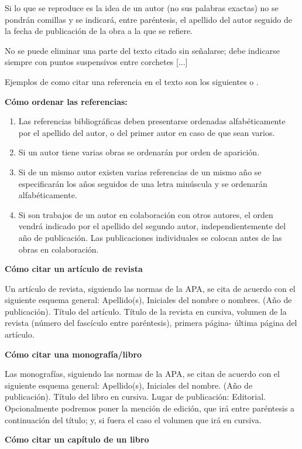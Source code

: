 \documentclass[spanish,12pt, a4paper, twoside]{paper}
\begin{document}
Si lo que se reproduce es la idea de un autor (no sus palabras exactas) no se pondrán comillas y se indicará, entre paréntesis, el apellido del autor seguido de la fecha de publicación de la obra a la que se refiere.

No se puede eliminar una parte del texto citado sin señalarse; debe indicarse siempre con puntos suspensivos entre corchetes [...]

Ejemplos de como citar una referencia en el texto son los siguientes \cite{Ashtiani2014} o \cite{Ashtiani2014,Mateos2009,Vicente2016}.


\bigskip
{\bf Cómo ordenar las referencias:}
\begin{enumerate}
\item Las referencias bibliográficas deben presentarse ordenadas alfabéticamente por el apellido del autor, o del primer autor en caso de que sean varios.
\item Si un autor tiene varias obras se ordenarán por orden de aparición.
\item Si de un mismo autor existen varias referencias de un mismo año se especificarán los años seguidos de una letra minúscula y se ordenarán alfabéticamente.
\item Si son trabajos de un autor en colaboración con otros autores, el orden vendrá indicado por el apellido del segundo autor, independientemente del año de publicación. Las publicaciones individuales se colocan antes de las obras en colaboración.
\end{enumerate}

\bigskip
{\bf Cómo citar un artículo de revista}

Un artículo de revista, siguiendo las normas de la APA, se cita de acuerdo con el siguiente esquema general:
Apellido(s), Iniciales del nombre o nombres. (Año de publicación). Título del artículo. Título de la revista en cursiva, volumen de la revista (número del fascículo entre paréntesis), primera página- última página del artículo.

\bigskip
{\bf Cómo citar una monografía/libro}

Las monografías, siguiendo las normas de la APA, se citan de acuerdo con el siguiente esquema general:
Apellido(s), Iniciales del nombre. (Año de publicación). Título del libro en cursiva. Lugar de publicación: Editorial.
Opcionalmente podremos poner la mención de edición, que irá entre paréntesis a continuación del título; y, si fuera el caso el volumen que irá en cursiva.

\bigskip
{\bf Cómo citar un capítulo de un libro}
\end{document}
